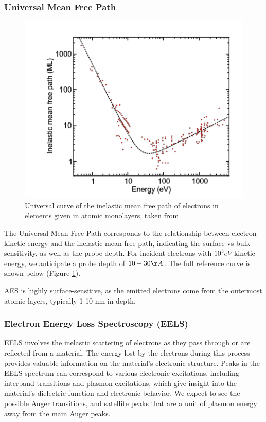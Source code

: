 \documentclass[12pt]{article}
\begin{document}
\subsubsection{Universal Mean Free Path }
\begin{figure}[H]
  \includegraphics[scale=0.7]{Universal_mean_free_path.png}
  \caption{Universal curve of the inelastic mean free path of electrons in elements given in atomic monolayers, taken from \cite{seah1979quantitative}}
  \label{fig:mfp}
\end{figure}
The Universal Mean Free Path corresponds to the relationship between electron kinetic energy and the inelastic mean free path, indicating the surface vs bulk sensitivity, as well as the probe depth. For incident electrons with $10^3eV$ kinetic energy, we anticipate a probe depth of $10-30\AA$. The full reference curve is shown below (Figure \ref{fig:mfp}).

AES is highly surface-sensitive, as the emitted electrons come from the outermost atomic layers, typically 1-10 nm in depth.

\subsubsection{Electron Energy Loss Spectroscopy (EELS)}
EELS involves the inelastic scattering of electrons as they pass through or are reflected from a material. The energy lost by the electrons during this process provides valuable information on the material's electronic structure. Peaks in the EELS spectrum can correspond to various electronic excitations, including interband transitions and plasmon excitations, which give insight into the material's dielectric function and electronic behavior. We expect to see the possible Auger transitions, and satellite peaks that are a unit of plasmon energy away from the main Auger peaks.
\end{document}
